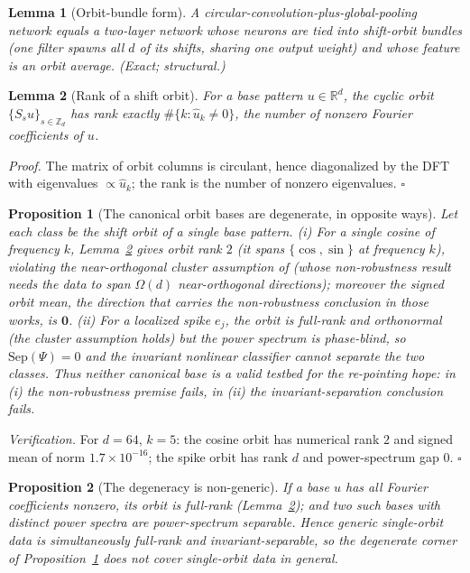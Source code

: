 \documentclass{article}
\newtheorem{lemma}{Lemma}
\newtheorem{proposition}{Proposition}
\theoremstyle{definition}
\newcommand{\R}{\mathbb{R}}
\newcommand{\Z}{\mathbb{Z}}
\newcommand{\Sep}{\mathrm{Sep}}
\newcommand{\dd}{d}
\begin{document}
\begin{lemma}[Orbit-bundle form]\label{lem:bundle}
A circular-convolution-plus-global-pooling network equals a two-layer network whose neurons are tied into shift-orbit bundles (one filter spawns all $\dd$ of its shifts, sharing one output weight) and whose feature is an orbit average. (Exact; structural.)
\end{lemma}

\begin{lemma}[Rank of a shift orbit]\label{lem:rank}
For a base pattern $u\in\R^\dd$, the cyclic orbit $\{S_s u\}_{s\in\Z_\dd}$ has rank exactly $\#\{k:\hat u_k\neq0\}$, the number of nonzero Fourier coefficients of $u$.
\end{lemma}
\emph{Proof.} The matrix of orbit columns is circulant, hence diagonalized by the DFT with eigenvalues $\propto\hat u_k$; the rank is the number of nonzero eigenvalues. \hfill$\square$

\begin{proposition}[The canonical orbit bases are degenerate, in opposite ways]\label{prop:rank}
Let each class be the shift orbit of a single base pattern. (i) For a single cosine of frequency $k$, Lemma~\ref{lem:rank} gives orbit rank $2$ (it spans $\{\cos,\sin\}$ at frequency $k$), violating the near-orthogonal cluster assumption of \citet{frei2023double,li2025feature} (whose non-robustness result needs the data to span $\Omega(\dd)$ near-orthogonal directions); moreover the signed orbit mean, the direction that carries the non-robustness conclusion in those works, is $\mathbf 0$. (ii) For a localized spike $e_j$, the orbit is full-rank and orthonormal (the cluster assumption holds) but the power spectrum is phase-blind, so $\Sep(\Psi)=0$ and the invariant nonlinear classifier cannot separate the two classes. Thus neither canonical base is a valid testbed for the re-pointing hope: in (i) the non-robustness premise fails, in (ii) the invariant-separation conclusion fails.
\end{proposition}
\emph{Verification.} For $\dd=64$, $k=5$: the cosine orbit has numerical rank $2$ and signed mean of norm $1.7\times10^{-16}$; the spike orbit has rank $\dd$ and power-spectrum gap $0$. \hfill$\square$

\begin{proposition}[The degeneracy is non-generic]\label{prop:generic}
If a base $u$ has all Fourier coefficients nonzero, its orbit is full-rank (Lemma~\ref{lem:rank}); and two such bases with distinct power spectra are power-spectrum separable. Hence generic single-orbit data is simultaneously full-rank and invariant-separable, so the degenerate corner of Proposition~\ref{prop:rank} does not cover single-orbit data in general.
\end{proposition}
\end{document}
